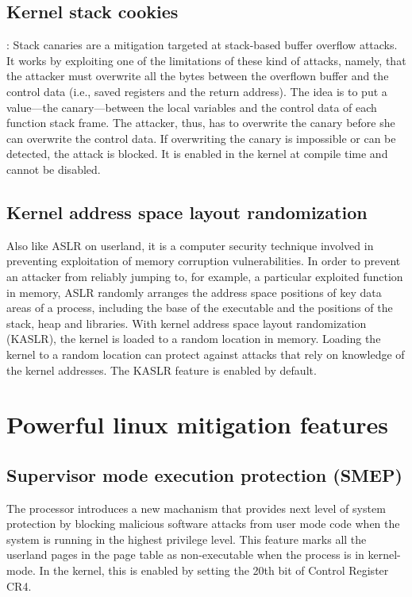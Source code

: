 \documentclass{masterthesis}
\begin{document}
\subsection{Kernel stack cookies}:
\label{subsect:canary} 
Stack canaries are a mitigation targeted at stack-based buffer overflow attacks. It works by exploiting one of the limitations of these kind of attacks, namely, that the attacker must overwrite all the bytes between the overflown buffer and the control data (i.e., saved registers and the return address). The idea is to put a value—the canary—between the local variables and the control data of each function stack frame. The attacker, thus, has to overwrite the canary before she can overwrite the control data. If overwriting the canary is impossible or can be detected, the attack is blocked.
It is enabled in the kernel at compile time and cannot be disabled.

\subsection{Kernel address space layout randomization}
\label{subsect:KASLR}
Also like ASLR on userland, it is a computer security technique involved in preventing exploitation of memory corruption vulnerabilities. In order to prevent an attacker from reliably jumping to, for example, a particular exploited function in memory, ASLR randomly arranges the address space positions of key data areas of a process, including the base of the executable and the positions of the stack, heap and libraries.
With kernel address space layout randomization (KASLR), the kernel is loaded to a random location in memory.
Loading the kernel to a random location can protect against attacks that rely on knowledge of the kernel addresses.
The KASLR feature is enabled by default.

\section{Powerful linux mitigation features}
\label{sect:powerful mitigation}

\subsection{Supervisor mode execution protection (SMEP)}
\label{subsect:SMEP}
The processor introduces a new machanism that provides next level of system protection by blocking malicious software attacks from user mode code when the system is running in the highest privilege level.
This feature marks all the userland pages in the page table as non-executable when the process is in kernel-mode. In the kernel, this is enabled by setting the 20th bit of Control Register CR4.
\end{document}
